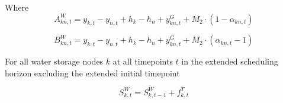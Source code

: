 Where
\begin{equation*}
  A^W_{kn,t} = y_{k,t} - y_{n,t} + h_k - h_n + y^G_{kn,t} + M_2 \cdot (1 - \alpha_{kn,t})
\end{equation*}

\begin{equation*}
  B^W_{kn,t} = y_{k,t} - y_{n,t} + h_k - h_n + y^G_{kn,t} + M_2 \cdot (\alpha_{kn,t} - 1)
\end{equation*}


For all water storage nodes $k$ at all timepoints $t$ in the extended scheduling
horizon excluding the extended initial timepoint

\begin{equation}
  S^W_{k,t} = S^W_{k,t-1} + f^T_{k,t}
\end{equation}
